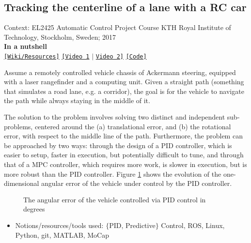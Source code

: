\subsection{Tracking the centerline of a lane with a RC car}

\noindent Context: EL2425 Automatic Control Project Course
\noindent KTH Royal Institute of Technology, Stockholm, Sweden; 2017\\

\noindent \textbf{In a nutshell}\\
\noindent \href{https://github.com/li9i/HT16_P2_EL2425_resources}{\texttt{[Wiki/Resources]}} \href{https://www.youtube.com/watch?v=w3Wnw5SLmss}{\texttt{[Video 1}} $|$ \href{https://youtu.be/937OZez1iN8?t=142}{\texttt{Video 2]}} \href{https://github.com/li9i/HT16_P2_EL2425}{\texttt{[Code]}}\\

\begin{problem}
Assume a remotely controlled vehicle chassis of Ackermann
steering, equipped with a laser rangefinder and a computing unit. Given a
straight path (something that simulates a road lane, e.g. a corridor), the goal
is for the vehicle to navigate the path while always staying in the middle of it.
\end{problem}

The solution to the problem involves solving two distinct and independent
sub-problems, centered around the (a) translational error, and (b) the
rotational error, with respect to the middle line of the path. Furthermore, the
problem can be approached by two ways: through the design of a PID controller,
which is easier to setup, faster in execution, but potentially difficult to
tune, and through that of a MPC controller, which requires more work, is slower
in execution, but is more robust than the PID controller. Figure
\ref{fig:centerline_pid_error} shows the evolution of the one-dimensional
angular error of the vehicle under control by the PID controller.

\begin{figure}[H]\centering
  \scalebox{0.6}{}
  \caption{\small The angular error of the vehicle controlled via PID control
           in degrees}
  \label{fig:centerline_pid_error}
\end{figure}

\begin{itemize}
  \item Notions/resources/tools used: $\{$PID, Predictive$\}$ Control, ROS,  Linux, Python, git, MATLAB, MoCap
\end{itemize}
